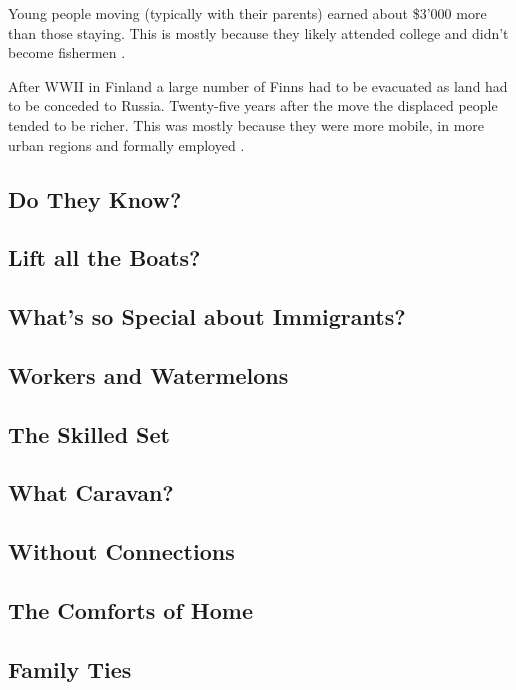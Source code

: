\documentclass[a4paper, twocolumn]{article}
\begin{document}
Young people moving (typically with their parents) earned about \$3'000 more than those staying. This is mostly because they likely attended college and didn't become fishermen \cite{iceland-volcano}.

After WWII in Finland a large number of Finns had to be evacuated as land had to be conceded to Russia. Twenty-five years after the move the displaced people tended to be richer. This was mostly because they were more mobile, in more urban regions and formally employed \cite{finland-ww2}.

\subsection{Do They Know?}


\subsection{Lift all the Boats?}


\subsection{What's so Special about Immigrants?}


\subsection{Workers and Watermelons}


\subsection{The Skilled Set}


\subsection{What Caravan?}


\subsection{Without Connections}


\subsection{The Comforts of Home}


\subsection{Family Ties}
\end{document}
